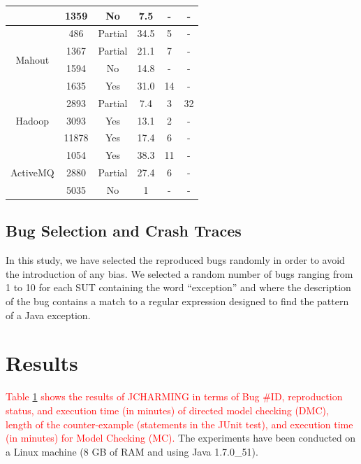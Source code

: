 \documentclass[times, doublespace]{smrauth}
\newcommand{\red}[1]{\textcolor{red}{#1}}
\begin{document}
{\begin{table}[H]
\begin{tabular}{c|c|c|c|c|c}
                            & 1359     & No      & 7.5    & -    & - \\ \hline
\multirow{4}{*}{Mahout}     & 486      & Partial & 34.5   & 5    & -        \\
                            & 1367     & Partial & 21.1   & 7  & -       \\
                            & 1594 	   & No 	 & 14.8 	  & -  & -       \\
                            & 1635     & Yes     & 31.0   & 14  & - \\ \hline
\multirow{3}{*}{Hadoop}     & 2893     & Partial & 7.4    & 3  & 32       \\
						    & 3093      & Yes 	   & 13.1     & 2     & -   \\
                            & 11878    & Yes 	 & 17.4     & 6 & - \\  \hline
\multirow{3}{*}{ActiveMQ}   & 1054     & Yes     & 38.3   & 11  & -      \\
						    & 2880      & Partial  & 27.4    & 6    & -       \\
                            & 5035     & No 	 & 1  & -  & - \\  \hline \hline
\end{tabular}


\label{tab:jcharming-results}
\end{table}


\subsection{Bug Selection and Crash Traces}

In this study, we have selected the reproduced bugs randomly
in order to avoid the introduction of any bias. We selected a
random number of bugs ranging from 1 to 10 for each SUT containing the word ``exception'' and where the description of
the bug contains a match to a regular expression designed to find the pattern of a
Java exception.

\section{Results\label{sec:results}}

\red{Table \ref{tab:jcharming-results} shows the results of JCHARMING in terms of Bug
\#ID, reproduction status, and execution time (in minutes) of
directed model checking (DMC), length of the counter-example (statements in the JUnit test), and  execution time (in minutes) for Model Checking (MC).}
The experiments have been conducted on a Linux machine (8
GB of RAM and using Java 1.7.0\_51).

}
\end{document}
